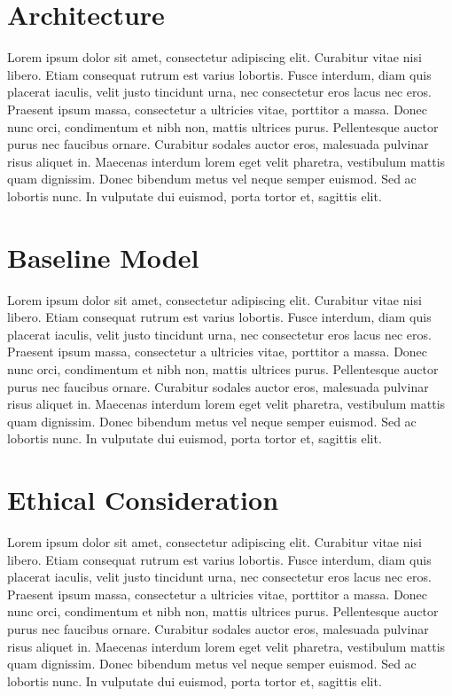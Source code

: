 \documentclass{article}
\begin{document}
\section{Architecture}
Lorem ipsum dolor sit amet, consectetur adipiscing elit. Curabitur vitae nisi libero. Etiam consequat rutrum est varius lobortis. Fusce interdum, diam quis placerat iaculis, velit justo tincidunt urna, nec consectetur eros lacus nec eros. Praesent ipsum massa, consectetur a ultricies vitae, porttitor a massa. Donec nunc orci, condimentum et nibh non, mattis ultrices purus. Pellentesque auctor purus nec faucibus ornare. Curabitur sodales auctor eros, malesuada pulvinar risus aliquet in. Maecenas interdum lorem eget velit pharetra, vestibulum mattis quam dignissim. Donec bibendum metus vel neque semper euismod. Sed ac lobortis nunc. In vulputate dui euismod, porta tortor et, sagittis elit.

\section{Baseline Model}
Lorem ipsum dolor sit amet, consectetur adipiscing elit. Curabitur vitae nisi libero. Etiam consequat rutrum est varius lobortis. Fusce interdum, diam quis placerat iaculis, velit justo tincidunt urna, nec consectetur eros lacus nec eros. Praesent ipsum massa, consectetur a ultricies vitae, porttitor a massa. Donec nunc orci, condimentum et nibh non, mattis ultrices purus. Pellentesque auctor purus nec faucibus ornare. Curabitur sodales auctor eros, malesuada pulvinar risus aliquet in. Maecenas interdum lorem eget velit pharetra, vestibulum mattis quam dignissim. Donec bibendum metus vel neque semper euismod. Sed ac lobortis nunc. In vulputate dui euismod, porta tortor et, sagittis elit.

\section{Ethical Consideration}
Lorem ipsum dolor sit amet, consectetur adipiscing elit. Curabitur vitae nisi libero. Etiam consequat rutrum est varius lobortis. Fusce interdum, diam quis placerat iaculis, velit justo tincidunt urna, nec consectetur eros lacus nec eros. Praesent ipsum massa, consectetur a ultricies vitae, porttitor a massa. Donec nunc orci, condimentum et nibh non, mattis ultrices purus. Pellentesque auctor purus nec faucibus ornare. Curabitur sodales auctor eros, malesuada pulvinar risus aliquet in. Maecenas interdum lorem eget velit pharetra, vestibulum mattis quam dignissim. Donec bibendum metus vel neque semper euismod. Sed ac lobortis nunc. In vulputate dui euismod, porta tortor et, sagittis elit.
\end{document}
